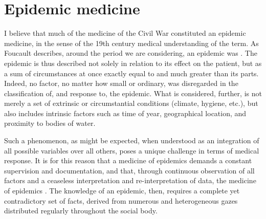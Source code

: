 \documentclass{report}
\begin{document}
  \section{Epidemic medicine}\label{sec:epidemic_medicine} %
  I believe that much of the medicine of the Civil War constituted an epidemic medicine, in the sense of the 19th century medical understanding of the term.
  As Foucault describes, around the period we are considering, an epidemic was  \autocite[pp. 23]{Foucault1994}. The epidemic is thus described not solely in relation to its
  effect on the patient, but as a sum of circumstances at once exactly equal to and much greater than its parts. Indeed, no factor,
  no matter how small or ordinary, was disregarded in the classification of, and response to, the epidemic. What is considered, further, is not merely a set
  of extrinsic or circumstantial conditions (climate, hygiene, etc.), but also includes intrinsic factors such as time of year, geographical location,
  and proximity to bodies of water. 

  Such a phenomenon, as might be expected, when understood as an integration of all possible variables over all others, poses a unique challenge in terms of medical
  response. It is for this reason that a medicine of epidemics demands a constant supervision and documentation, and that, through continuous observation
  of all factors and a ceaseless interpretation and re-interpretation of data, the medicine of epidemics  \autocite[pp. 25]{Foucault1994}. The knowledge of an epidemic, then, requires a complete
  yet contradictory set of facts, derived from numerous and heterogeneous gazes distributed regularly throughout the social body. 
\end{document}
